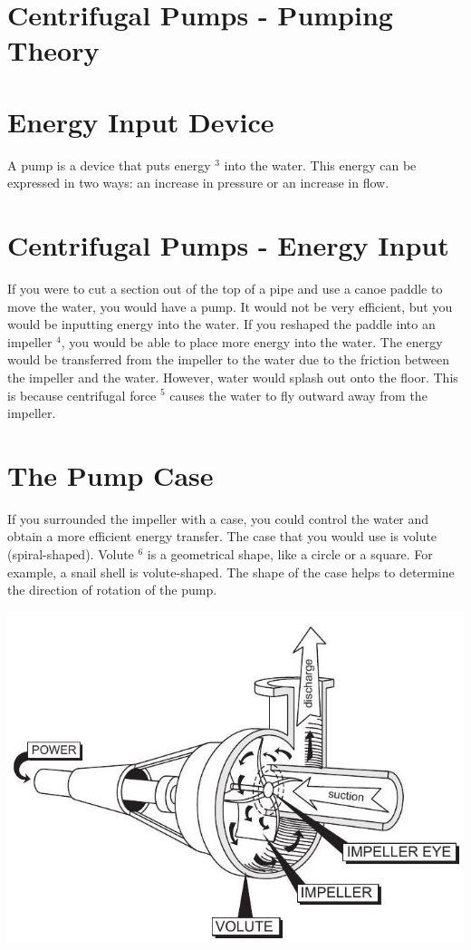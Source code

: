 \documentclass[10pt]{article}
\begin{document}
\section{Centrifugal Pumps - Pumping Theory}
\section{Energy Input Device}
A pump is a device that puts energy ${ }^{3}$ into the water. This energy can be expressed in two ways: an increase in pressure or an increase in flow.

\section{Centrifugal Pumps - Energy Input}
If you were to cut a section out of the top of a pipe and use a canoe paddle to move the water, you would have a pump. It would not be very efficient, but you would be inputting energy into the water. If you reshaped the paddle into an impeller ${ }^{4}$, you would be able to place more energy into the water. The energy would be transferred from the impeller to the water due to the friction between the impeller and the water. However, water would splash out onto the floor. This is because centrifugal force ${ }^{5}$ causes the water to fly outward away from the impeller.

\section{The Pump Case}
If you surrounded the impeller with a case, you could control the water and obtain a more efficient energy transfer. The case that you would use is volute (spiral-shaped). Volute ${ }^{6}$ is a geometrical shape, like a circle or a square. For example, a snail shell is volute-shaped. The shape of the case helps to determine the direction of rotation of the pump.

\includegraphics[max width=\textwidth]{CentrifugalPumpCase}
\end{document}
